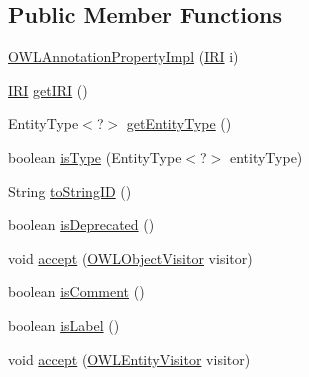 \subsection*{Public Member Functions}
\begin{DoxyCompactItemize}
\item 
\hyperlink{classuk_1_1ac_1_1manchester_1_1cs_1_1owl_1_1owlapi_1_1_o_w_l_annotation_property_impl_abc80cea8dcc9965382b18819484253ed}{O\-W\-L\-Annotation\-Property\-Impl} (\hyperlink{classorg_1_1semanticweb_1_1owlapi_1_1model_1_1_i_r_i}{I\-R\-I} i)
\item 
\hyperlink{classorg_1_1semanticweb_1_1owlapi_1_1model_1_1_i_r_i}{I\-R\-I} \hyperlink{classuk_1_1ac_1_1manchester_1_1cs_1_1owl_1_1owlapi_1_1_o_w_l_annotation_property_impl_a3628c4fba0f893a7293d417e5f06b1e7}{get\-I\-R\-I} ()
\item 
Entity\-Type$<$?$>$ \hyperlink{classuk_1_1ac_1_1manchester_1_1cs_1_1owl_1_1owlapi_1_1_o_w_l_annotation_property_impl_a878becb09ab2dd7eb988b2d354749b09}{get\-Entity\-Type} ()
\item 
boolean \hyperlink{classuk_1_1ac_1_1manchester_1_1cs_1_1owl_1_1owlapi_1_1_o_w_l_annotation_property_impl_a651e31c3b6a360e603f2f730ab0dde05}{is\-Type} (Entity\-Type$<$?$>$ entity\-Type)
\item 
String \hyperlink{classuk_1_1ac_1_1manchester_1_1cs_1_1owl_1_1owlapi_1_1_o_w_l_annotation_property_impl_af35f49464254a6356da03a061942af69}{to\-String\-I\-D} ()
\item 
boolean \hyperlink{classuk_1_1ac_1_1manchester_1_1cs_1_1owl_1_1owlapi_1_1_o_w_l_annotation_property_impl_a6d8247f94a4941430ee68d9aab733e4a}{is\-Deprecated} ()
\item 
void \hyperlink{classuk_1_1ac_1_1manchester_1_1cs_1_1owl_1_1owlapi_1_1_o_w_l_annotation_property_impl_af12e7b8536d50cea993503fdf4bfa405}{accept} (\hyperlink{interfaceorg_1_1semanticweb_1_1owlapi_1_1model_1_1_o_w_l_object_visitor}{O\-W\-L\-Object\-Visitor} visitor)
\item 
boolean \hyperlink{classuk_1_1ac_1_1manchester_1_1cs_1_1owl_1_1owlapi_1_1_o_w_l_annotation_property_impl_a804d25c9e9a29caa5b0c779bb7d4eede}{is\-Comment} ()
\item 
boolean \hyperlink{classuk_1_1ac_1_1manchester_1_1cs_1_1owl_1_1owlapi_1_1_o_w_l_annotation_property_impl_a237f917e4732b8c20607429953ccb6e2}{is\-Label} ()
\item 
void \hyperlink{classuk_1_1ac_1_1manchester_1_1cs_1_1owl_1_1owlapi_1_1_o_w_l_annotation_property_impl_acd68c99dedaa98177e5d4f093fbaed61}{accept} (\hyperlink{interfaceorg_1_1semanticweb_1_1owlapi_1_1model_1_1_o_w_l_entity_visitor}{O\-W\-L\-Entity\-Visitor} visitor)

\end{DoxyCompactItemize}
